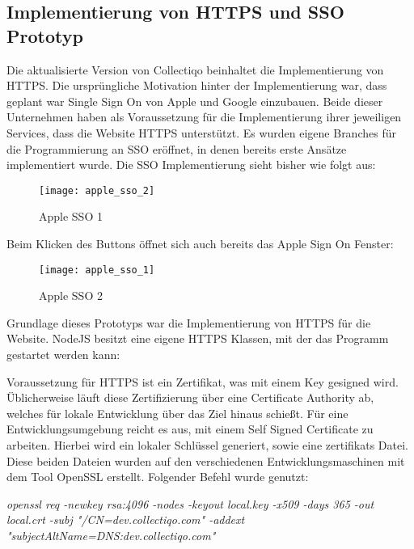 \subsection{Implementierung von HTTPS und SSO Prototyp}\label{subsec:implementierung-von-https}

Die aktualisierte Version von Collectiqo beinhaltet die Implementierung von HTTPS.
Die ursprüngliche Motivation hinter der Implementierung war, dass geplant war Single Sign On von Apple und Google einzubauen.
Beide dieser Unternehmen haben als Voraussetzung für die Implementierung ihrer jeweiligen Services, dass die Website HTTPS unterstützt.
Es wurden eigene Branches für die Programmierung an SSO eröffnet, in denen bereits erste Ansätze implementiert wurde.
Die SSO Implementierung sieht bisher wie folgt aus:

\begin{figure}[h]
    \centering
    \texttt{[image: apple\_sso\_2]}
    \caption{Apple SSO 1}
    \label{fig:apple_sso_1}
\end{figure}

Beim Klicken des Buttons öffnet sich auch bereits das Apple Sign On Fenster:

\begin{figure}[h]
    \centering
    \texttt{[image: apple\_sso\_1]}
    \caption{Apple SSO 2}
    \label{fig:apple_sso_2}
\end{figure}

Grundlage dieses Prototyps war die Implementierung von HTTPS für die Website.
NodeJS besitzt eine eigene HTTPS Klassen, mit der das Programm gestartet werden kann:

\vspace{1em}
% 
\vspace{1em}

Voraussetzung für HTTPS ist ein Zertifikat, was mit einem Key gesigned wird.
Üblicherweise läuft diese Zertifizierung über eine Certificate Authority ab, welches für lokale Entwicklung über das Ziel hinaus schießt.
Für eine Entwicklungsumgebung reicht es aus, mit einem Self Signed Certificate zu arbeiten.
Hierbei wird ein lokaler Schlüssel generiert, sowie eine zertifikats Datei.
Diese beiden Dateien wurden auf den verschiedenen Entwicklungsmaschinen mit dem Tool OpenSSL erstellt.
Folgender Befehl wurde genutzt:

\vspace{1em}
\textit{openssl req -newkey rsa:4096 -nodes -keyout local.key -x509 -days 365 -out local.crt -subj "/CN=dev.collectiqo.com" -addext "subjectAltName=DNS:dev.collectiqo.com"}
\vspace{1em}

